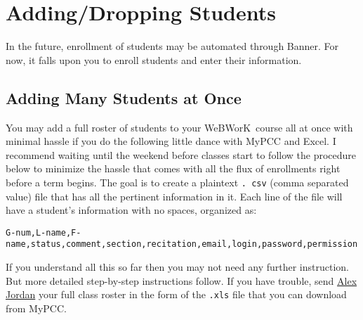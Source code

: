 \documentclass[12pt]{article}
\newcommand{\WW}{WeBWorK}
\begin{document}
\section{Adding/Dropping Students}
In the future, enrollment of students may be automated through Banner.
For now, it falls upon you to enroll students and enter their information.

\subsection{Adding Many Students at Once}
You may add a full roster of students to your \WW\ course all at once with minimal hassle if you do the following little dance with MyPCC and Excel.
I recommend waiting until the weekend before classes start to follow the procedure below to minimize the hassle that comes with all the flux of enrollments right before a term begins.
The goal is to create a plaintext \texttt{.
	csv} (comma separated value) file that has all the pertinent information in it.
Each line of the file will have a student's information with no spaces, organized as:\\ 

\small \centerline{\texttt{G-num,L-name,F-name,status,comment,section,recitation,email,login,password,permission}} \normalsize \vspace{1pc} 

If you understand all this so far then you may not need any further instruction.
But more detailed step-by-step instructions follow.
If you have trouble, send \href{mailto:alex.
	jordan@pcc.edu}{Alex Jordan} your full class roster in the form of the \texttt{.xls} file that you can download from MyPCC.
\end{document}

